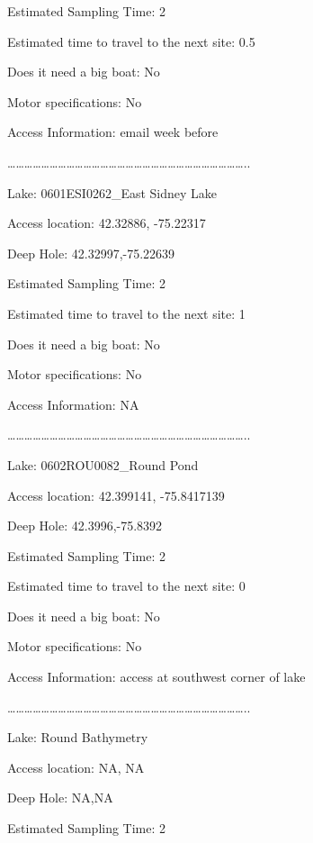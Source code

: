 \documentclass[]{article}
\begin{document}
Estimated Sampling Time: 2

Estimated time to travel to the next site: 0.5

Does it need a big boat: No

Motor specifications: No

Access Information: email week before

\ldots{}\ldots{}\ldots{}\ldots{}\ldots{}\ldots{}\ldots{}\ldots{}\ldots{}\ldots{}\ldots{}\ldots{}\ldots{}\ldots{}\ldots{}\ldots{}\ldots{}\ldots{}\ldots{}\ldots{}\ldots{}\ldots{}\ldots{}\ldots{}\ldots{}\ldots{}\ldots{}\ldots{}..

Lake: 0601ESI0262\_East Sidney Lake

Access location: 42.32886, -75.22317

Deep Hole: 42.32997,-75.22639

Estimated Sampling Time: 2

Estimated time to travel to the next site: 1

Does it need a big boat: No

Motor specifications: No

Access Information: NA

\ldots{}\ldots{}\ldots{}\ldots{}\ldots{}\ldots{}\ldots{}\ldots{}\ldots{}\ldots{}\ldots{}\ldots{}\ldots{}\ldots{}\ldots{}\ldots{}\ldots{}\ldots{}\ldots{}\ldots{}\ldots{}\ldots{}\ldots{}\ldots{}\ldots{}\ldots{}\ldots{}\ldots{}..

Lake: 0602ROU0082\_Round Pond

Access location: 42.399141, -75.8417139

Deep Hole: 42.3996,-75.8392

Estimated Sampling Time: 2

Estimated time to travel to the next site: 0

Does it need a big boat: No

Motor specifications: No

Access Information: access at southwest corner of lake

\ldots{}\ldots{}\ldots{}\ldots{}\ldots{}\ldots{}\ldots{}\ldots{}\ldots{}\ldots{}\ldots{}\ldots{}\ldots{}\ldots{}\ldots{}\ldots{}\ldots{}\ldots{}\ldots{}\ldots{}\ldots{}\ldots{}\ldots{}\ldots{}\ldots{}\ldots{}\ldots{}\ldots{}..

Lake: Round Bathymetry

Access location: NA, NA

Deep Hole: NA,NA

Estimated Sampling Time: 2
\end{document}
